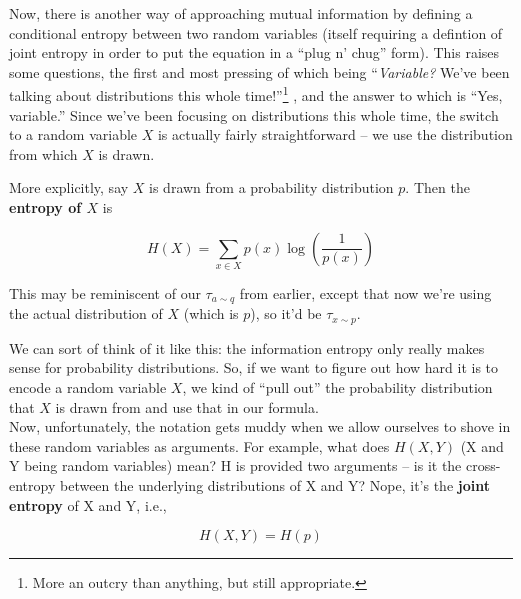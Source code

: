 \documentclass[letterpaper,12pt]{report}
\begin{document}
Now, there is another way of approaching mutual information by 
defining a conditional entropy between two random variables 
(itself requiring a defintion of joint entropy in order to put
the equation in a ``plug n' chug'' form). This raises some questions, the
first and most pressing of which being ``\emph{Variable?} We've been talking
about distributions this whole time!''\footnote
{
  More an outcry than anything, but still appropriate.
} 
, and the answer to which is ``Yes, variable.'' Since we've been 
focusing on distributions this whole time, the switch to a random variable \(X\) is
actually fairly straightforward -- we use the distribution from which \(X\) is drawn.

More explicitly, say \(X\) is drawn from a probability distribution \(p\). Then the
\textbf{entropy of \(X\)} is

\[ H(X) = \sum_{x \in X} p(x) \log\left(\frac{1}{p(x)}\right) \]

This may be reminiscent of our \(\tau_{a \sim q}\) from earlier, except that now we're using
the actual distribution of \(X\) (which is \(p\)), so it'd be \(\tau_{x \sim p}\). 

We can sort of think of it like this: the information entropy only really makes sense
for probability distributions. So, if we want to figure out how hard it 
is to encode a random variable \(X\),
we kind of ``pull out'' the probability distribution that \(X\) is drawn from and
use that in our formula.
\\
Now, unfortunately, the notation gets muddy when we allow ourselves to shove in
these random variables as arguments. For example, what does \(H(X,Y)\) (X and Y being
random variables) mean? H is provided two arguments -- is it the cross-entropy between
the underlying distributions of X and Y? Nope, it's the \textbf{joint entropy} of X and Y,
i.e., 

\[ H(X,Y) = H(p)\]
\end{document}

